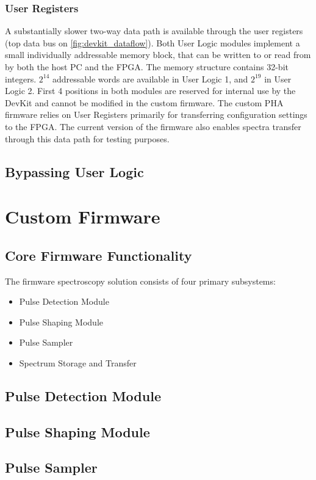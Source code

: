 \documentclass[12pt]{article}
\begin{document}
		\subsubsection{User Registers}
		A substantially slower two-way data path is available through the user registers (top data bus on \autoref{fig:devkit_dataflow}). Both User Logic modules
		implement a small individually addressable memory block, that can be written to or read from by both 
		the host PC and the FPGA. The memory structure contains 32-bit integers. $2^{14}$ addressable words
		are available in User Logic 1, and $2^{19}$ in User Logic 2. First 4 positions in both modules are reserved 
		for internal use by the DevKit and cannot be modified in the custom firmware. The custom PHA firmware
		relies on User Registers primarily for transferring configuration settings to the FPGA.
		The current version of the firmware also enables spectra transfer through this data path for testing purposes.
	\subsection{Bypassing User Logic}


\section{Custom Firmware}
\subsection{Core Firmware Functionality}
The firmware spectroscopy solution consists of four primary subsystems:
\begin{itemize}
	\item Pulse Detection Module
	\item Pulse Shaping Module
	\item Pulse Sampler
	\item Spectrum Storage and Transfer
\end{itemize}
\subsection{Pulse Detection Module}
\subsection{Pulse Shaping Module}
\subsection{Pulse Sampler}
\end{document}

